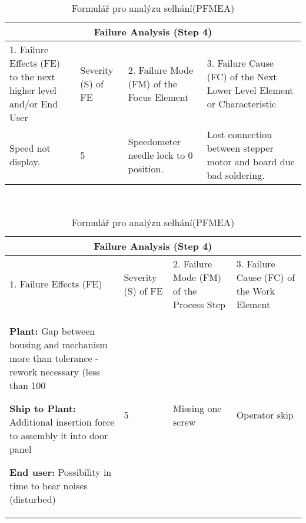 \begin{center}
\begin{table}[htp]
	\centering
	\caption{Formulář pro analýzu selhání(DFMEA) }
	\label{tab:failure_DFMEA}
\begin{tabular}{ |p{5cm}|p{0.5cm}|p{4cm}|p{4cm}|  }
 \hline
 \multicolumn{4}{|c|}{Failure Analysis (Step 4)} \\
 \hline
  1. Failure Effects (FE) to the next higher level and/or End User&
  \begin{turn}{-90}Severity (S) of FE\end{turn} &
2. Failure Mode (FM) of the Focus Element &
3. Failure Cause (FC) of the Next Lower Level Element or Characteristic
\\
 \hline
 Speed not display.
  & 5
  & Speedometer needle lock to 0 position. & Lost connection between stepper motor and board due bad soldering.
\\
 \hline
\end{tabular}\  
\\
\hfill \break
\hfill \break
\centering
	\caption{Formulář pro analýzu selhání(PFMEA) }
	\label{tab:failure_PFMEA}
\begin{tabular}{ |p{5cm}|p{0.5cm}|p{4cm}|p{4cm}|  }
 \hline
 \multicolumn{4}{|c|}{Failure Analysis (Step 4)} \\
 \hline
  1. Failure Effects (FE)
&
  \begin{turn}{-90}Severity (S) of FE\end{turn} &
2. Failure Mode (FM) of the Process Step
 &
3. Failure Cause (FC) of the Work Element

\\
 \hline
\textbf{Plant:}
Gap between housing and mechanism more than tolerance - rework necessary (less than 100%

\textbf{Ship to Plant:}
Additional insertion force to assembly it into door panel

\textbf{End user:}
Possibility in time to hear noises (disturbed)

  & 5
  & Missing one screw
 & Operator skip

\\
 \hline
\end{tabular}\  
\end{table}
\end{center}



